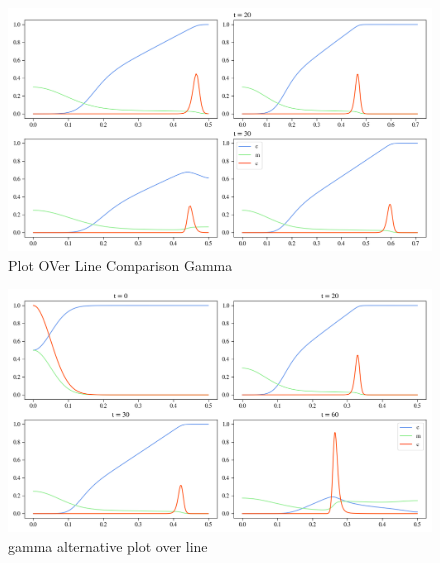 \begin{figure}[h]
    \centering
    \includegraphics[width=\textwidth]{resources/images/pol_comparison.png}
    \caption{Plot OVer Line Comparison Gamma}
    \label{fig:gamma_pol_comparison}
\end{figure}
\begin{figure}[h]
    \centering
    \includegraphics[width=\textwidth]{resources/images/gamma_alt_pol.png}
    \caption{gamma alternative plot over line}
    \label{fig:gamma_alt_pol}
\end{figure}

